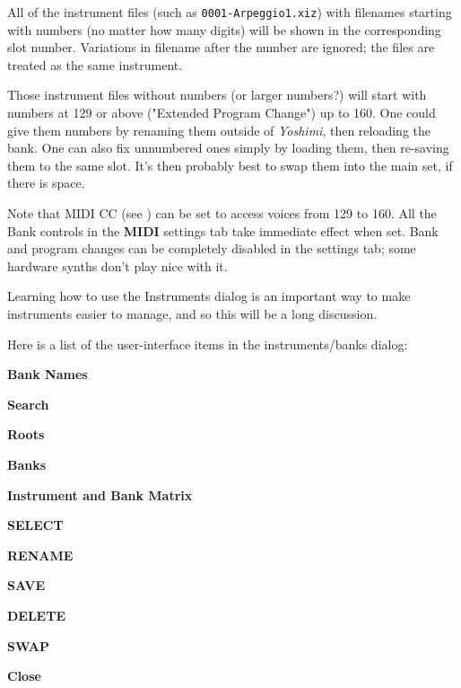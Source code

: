    All of the instrument files (such as \texttt{0001-Arpeggio1.xiz})
   with filenames starting with numbers (no matter how many digits)
   will be shown in the corresponding slot number.
   Variations in filename after the number are ignored; the files
   are treated as the same instrument.

   Those instrument files
   without numbers (or larger numbers?) will start
   with numbers at 129 or above ("Extended Program Change") up to 160.
   One could give them numbers by renaming them outside of \textsl{Yoshimi},
   then reloading the bank.
   One can also fix unnumbered ones simply by loading them, then re-saving them
   to the same slot. It's then probably best to swap them into the main set,
   if there is space.

   Note that MIDI CC
   (see )
   can be set to access voices from 129 to 160.
   All the Bank controls in the \textbf{MIDI} settings tab take immediate
   effect when set.
   Bank and program changes can be completely disabled in the settings tab;
   some hardware synths don't play nice with it.

   Learning how to use the Instruments dialog is an important way to make
   instruments easier to manage, and so this will be a long discussion.


   Here is a list of the user-interface items in the instruments/banks dialog:

   \begin{enumber}
      \item \textbf{Bank Names}
      \item \textbf{Search}
      \item \textbf{Roots}
      \item \textbf{Banks}
      \item \textbf{Instrument and Bank Matrix}
      \item \textbf{SELECT}
      \item \textbf{RENAME}
      \item \textbf{SAVE}
      \item \textbf{DELETE}
      \item \textbf{SWAP}
      \item \textbf{Close}
   \end{enumber}

